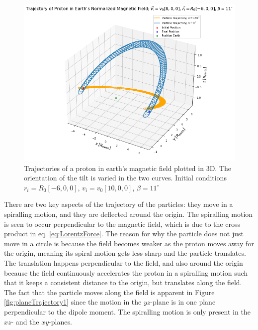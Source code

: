 \begin{figure}[H]
    \centering
    \includegraphics[scale=.4]{Images/protonTrajectories12.png}
    \caption{Trajectories of a proton in earth's magnetic field plotted in 3D. The orientation of the tilt is varied in the two curves. Initial conditions $r_i=R_0[-6,0,0]$, $v_i=v_0[10,0,0]$, $\beta=11^{\circ}$}
    \label{fig:3dTrajectory12}
\end{figure}

\noindent There are two key aspects of the trajectory of the particles: they move in a spiralling motion, and they are deflected around the origin. The spiralling motion is seen to occur perpendicular to the magnetic field, which is due to the cross product in eq. \ref{eq:LorentzForce}. The reason for why the particle does not just move in a circle is because the field becomes weaker as the proton moves away for the origin, meaning its spiral motion gets less sharp and the particle translates. The translation happens perpendicular to the field, and also around the origin because the field continuously accelerates the proton in a spiralling motion such that it keeps a consistent distance to the origin, but translates along the field. The fact that the particle moves along the field is apparent in Figure \ref{fig:planeTrajectory1} since the motion in the $yz$-plane is in one plane perpendicular to the dipole moment. The spiralling motion is only present in the $xz$- and the $xy$-planes.

